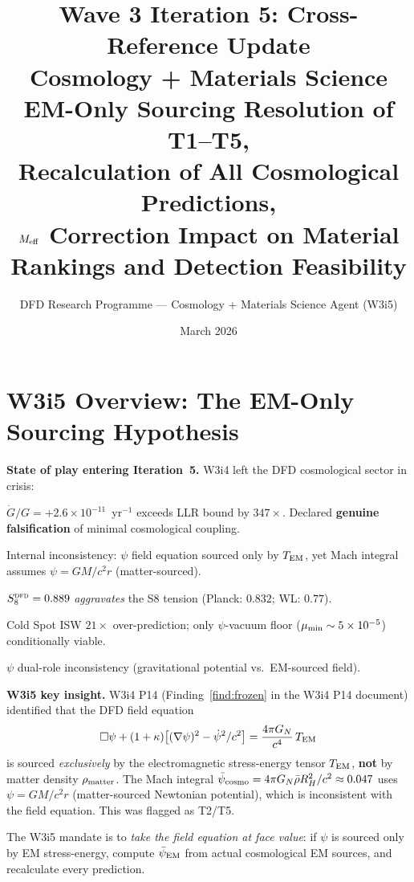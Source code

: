 \documentclass[11pt]{article}
\title{Wave 3 Iteration 5: Cross-Reference Update\\
\large Cosmology + Materials Science\\
\normalsize EM-Only Sourcing Resolution of T1--T5,\\
Recalculation of All Cosmological Predictions,\\
$M_{\rm eff}$ Correction Impact on Material Rankings and Detection Feasibility}
\author{DFD Research Programme --- Cosmology + Materials Science Agent (W3i5)}
\date{March 2026}
\newcommand{\ee}[1]{\times 10^{#1}}
\newcommand{\psicosmo}{\bar{\psi}_{\rm cosmo}}
\newcommand{\psiEM}{\bar{\psi}_{\rm EM}}
\newcommand{\GN}{G_N}
\newcommand{\Gdot}{\dot{G}/G}
\newcommand{\DFD}{\textsc{dfd}}
\newcommand{\mumin}{\mu_{\rm min}}
\begin{document}
\maketitle
\tableofcontents
\newpage

\section*{W3i5 Overview: The EM-Only Sourcing Hypothesis}
\label{sec:overview}

\noindent\textbf{State of play entering Iteration~5.}
W3i4 left the DFD cosmological sector in crisis:
\begin{description}[leftmargin=2em]
  \item[T1] $\Gdot = +2.6\ee{-11}$~yr$^{-1}$ exceeds LLR bound by $347\times$.
    Declared \textbf{genuine falsification} of minimal cosmological coupling.
  \item[T2] Internal inconsistency: $\psi$ field equation sourced only by
    $T_{\rm EM}$, yet Mach integral assumes $\psi = GM/c^2r$ (matter-sourced).
  \item[T3] $S_8^{\DFD} = 0.889$ \emph{aggravates} the S8 tension
    (Planck: $0.832$; WL: $0.77$).
  \item[T4] Cold Spot ISW $21\times$ over-prediction; only $\psi$-vacuum
    floor ($\mumin \sim 5\ee{-5}$) conditionally viable.
  \item[T5] $\psi$ dual-role inconsistency (gravitational potential vs.\
    EM-sourced field).
\end{description}

\noindent\textbf{W3i5 key insight.}
W3i4 P14 (Finding~\ref*{find:frozen} in the W3i4 P14 document) identified
that the DFD field equation
\begin{equation}\label{eq:psi-field-eq}
  \Box\psi + (1+\kappa)\bigl[(\nabla\psi)^2 - \dot\psi^2/c^2\bigr]
  = \frac{4\pi \GN}{c^4}\,T_{\rm EM}
\end{equation}
is sourced \emph{exclusively} by the electromagnetic stress-energy tensor
$T_{\rm EM}$, \textbf{not} by matter density $\rho_{\rm matter}$.
The Mach integral $\psicosmo = 4\pi \GN \bar\rho R_H^2/c^2 \approx 0.047$
uses $\psi = GM/c^2r$ (matter-sourced Newtonian potential), which is
inconsistent with the field equation. This was flagged as T2/T5.

The W3i5 mandate is to \emph{take the field equation at face value}:
if $\psi$ is sourced only by EM stress-energy, compute $\psiEM$ from
actual cosmological EM sources, and recalculate every prediction.
\end{document}
